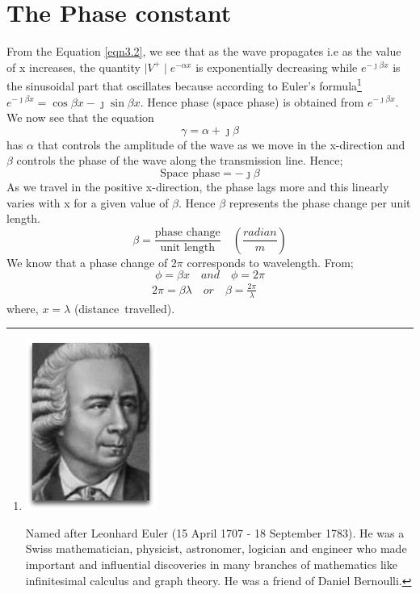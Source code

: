 \section{The Phase constant}
From the Equation \ref{eqn3.2}, we see that as the wave propagates i.e as the value of x increases, the quantity $\mid V^+\mid e^{-\alpha x}$ is exponentially decreasing while $e^{-\jmath\beta x}$ is the sinusoidal part that oscillates because according to Euler's formula\footnote{
\includegraphics[scale=0.2]{./graphics/euler}

Named after Leonhard Euler (15 April 1707 - 18 September 1783). He was a Swiss mathematician, physicist, astronomer, logician and engineer who made important and influential discoveries in many branches of mathematics like infinitesimal calculus and graph theory. He was a friend of Daniel Bernoulli.
} 
$e^{-\jmath\beta x} = \cos{\beta x} - \jmath \sin{ \beta x}$. Hence phase (space phase) is obtained from $e^{-\jmath\beta x}$.\\

We now see that the equation 
\begin{equation}
\gamma = \alpha + \jmath\beta 
\end{equation}
has $\alpha$ that controls the amplitude of the wave as we move in the x-direction and $\beta$ controls the phase of the wave along the transmission line. Hence;
\begin{equation}
\text{Space phase} = -\jmath\beta
\end{equation}
As we travel in the positive x-direction, the phase lags more and this linearly varies with x for a given value of $\beta$. Hence $\beta$ represents the phase change per unit length.
\begin{equation}
\beta = \frac{\text{phase change}}{\text{unit length}} \quad\left(\frac{radian}{m}\right)
\end{equation}
We know that a phase change of 2$\pi$ corresponds to wavelength. From;
\begin{equation}
\phi = \beta x \quad and  \quad\phi = 2\pi
\end{equation}
\begin{align*}
2\pi = \beta\lambda \quad or \quad\beta = \frac{2\pi}{\lambda} \quad
\end{align*}
where, $ x = \lambda $ (distance\ travelled).\\


